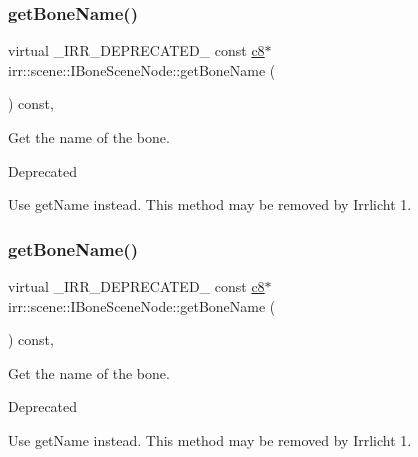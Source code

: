 \subsubsection{\texorpdfstring{get\+Bone\+Name()}{getBoneName()}\hspace{0.1cm}{\footnotesize\ttfamily [1/2]}}
{\footnotesize\ttfamily virtual \+\_\+\+I\+R\+R\+\_\+\+D\+E\+P\+R\+E\+C\+A\+T\+E\+D\+\_\+ const \hyperlink{namespaceirr_a9395eaea339bcb546b319e9c96bf7410}{c8}$\ast$ irr\+::scene\+::\+I\+Bone\+Scene\+Node\+::get\+Bone\+Name (\begin{DoxyParamCaption}{ }\end{DoxyParamCaption}) const\hspace{0.3cm}{\ttfamily [inline]}, {\ttfamily [virtual]}}



Get the name of the bone. 

\begin{DoxyRefDesc}{Deprecated}
\item[\hyperlink{deprecated__deprecated000001}{Deprecated}]Use get\+Name instead. This method may be removed by Irrlicht 1. \end{DoxyRefDesc}
\mbox{\label{classirr_1_1scene_1_1IBoneSceneNode_a1c40bee44b89fe81178782e999cbe3a8}} 
\subsubsection{\texorpdfstring{get\+Bone\+Name()}{getBoneName()}\hspace{0.1cm}{\footnotesize\ttfamily [2/2]}}
{\footnotesize\ttfamily virtual \+\_\+\+I\+R\+R\+\_\+\+D\+E\+P\+R\+E\+C\+A\+T\+E\+D\+\_\+ const \hyperlink{namespaceirr_a9395eaea339bcb546b319e9c96bf7410}{c8}$\ast$ irr\+::scene\+::\+I\+Bone\+Scene\+Node\+::get\+Bone\+Name (\begin{DoxyParamCaption}{ }\end{DoxyParamCaption}) const\hspace{0.3cm}{\ttfamily [inline]}, {\ttfamily [virtual]}}



Get the name of the bone. 

\begin{DoxyRefDesc}{Deprecated}
\item[\hyperlink{deprecated__deprecated000027}{Deprecated}]Use get\+Name instead. This method may be removed by Irrlicht 1. \end{DoxyRefDesc}
\mbox{\label{classirr_1_1scene_1_1IBoneSceneNode_a7e21d0722e5b105e4d2a956bff110a7f}} 
